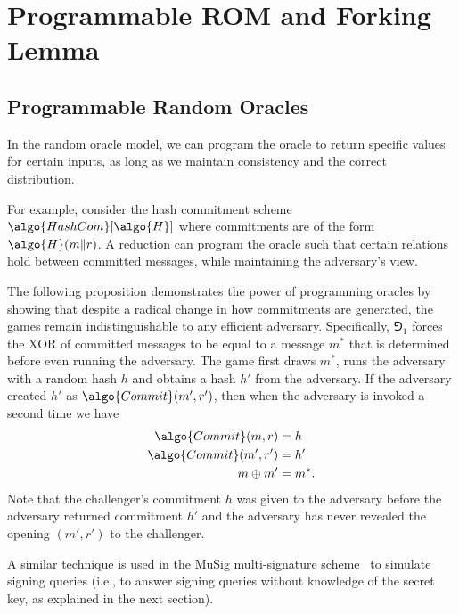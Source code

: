 \section{Programmable ROM and Forking Lemma}\label{sec:prog-rom}

\subsection{Programmable Random Oracles}

In the random oracle model, we can program the oracle to return specific values for certain inputs, as long as we maintain consistency and the correct distribution.

For example, consider the hash commitment scheme $\algo{HashCom}[\algo{H}]$ where commitments are of the form $\algo{H}(m \| r)$.
A reduction can program the oracle such that certain relations hold between committed messages, while maintaining the adversary's view.

The following proposition demonstrates the power of programming oracles by showing that despite a radical change in how commitments are generated, the games remain indistinguishable to any efficient adversary.
Specifically, $\Game_1$ forces the XOR of committed messages to be equal to a message $m^*$ that is determined before even running the adversary.
The game first draws $m^*$, runs the adversary with a random hash $h$ and obtains a hash  $h'$ from the adversary.
If the adversary created $h'$ as $\algo{Commit}(m', r')$, then when the adversary is invoked a second time we have
\begin{align*}
  \algo{Commit}(m, r) &= h\\
  \algo{Commit}(m', r') &= h'\\
  m \oplus m' &= m^*.
\end{align*}
Note that the challenger's commitment $h$ was given to the adversary before the adversary returned commitment $h'$ and the adversary has never revealed the opening $(m', r')$ to the challenger.

A similar technique is used in the MuSig multi-signature scheme~\cite{DCC:MPSW19} to simulate signing queries (i.e., to answer signing queries without knowledge of the secret key, as explained in the next section).

